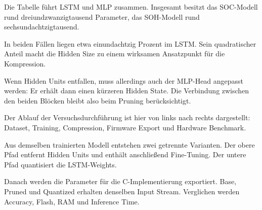 
\begin{sprechtext}

Die Tabelle führt LSTM und MLP zusammen. Insgesamt besitzt das SOC-Modell rund dreiundzwanzigtausend Parameter, das SOH-Modell rund sechsundachtzigtausend.

In beiden Fällen liegen etwa einundachtzig Prozent im LSTM. Sein quadratischer Anteil macht die Hidden Size zu einem wirksamen Ansatzpunkt für die Kompression.

Wenn Hidden Units entfallen, muss allerdings auch der MLP-Head angepasst werden: Er erhält dann einen kürzeren Hidden State. Die Verbindung zwischen den beiden Blöcken bleibt also beim Pruning berücksichtigt.

\end{sprechtext}


\begin{sprechtext}

Der Ablauf der Versuchsdurchführung ist hier von links nach rechts dargestellt: Dataset, Training, Compression, Firmware Export und Hardware Benchmark.

Aus demselben trainierten Modell entstehen zwei getrennte Varianten. Der obere Pfad entfernt Hidden Units und enthält anschließend Fine-Tuning. Der untere Pfad quantisiert die LSTM-Weights.

Danach werden die Parameter für die C-Implementierung exportiert. Base, Pruned und Quantized erhalten denselben Input Stream. Verglichen werden Accuracy, Flash, RAM und Inference Time.

\end{sprechtext}


